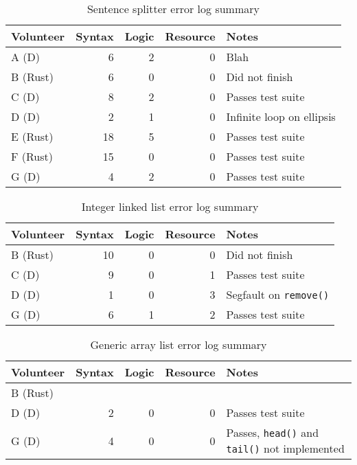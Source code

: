\documentclass[finalcopy]{srpaper}
\begin{document}
\begin{table}[h]
\centering
\begin{tabular}{lrrrp{5cm}}
\toprule
Volunteer & Syntax & Logic & Resource & Notes \\
\midrule
A (D) & 6 & 2 & 0 & Blah \\
B (Rust) & 6 & 0 & 0 & Did not finish \\
C (D) & 8 & 2 & 0 & Passes test suite \\
D (D) & 2 & 1 & 0 & Infinite loop on ellipsis \\
E (Rust) & 18 & 5 & 0 & Passes test suite \\
F (Rust) & 15 & 0 & 0 & Passes test suite \\
G (D) & 4 & 2 & 0 & Passes test suite \\
\bottomrule
\end{tabular}
\caption{Sentence splitter error log summary}
\label{tab:sentencesplitter}
\end{table}

\begin{table}[h]
\centering
\begin{tabular}{lrrrp{5cm}}
\toprule
Volunteer & Syntax & Logic & Resource & Notes \\
\midrule
B (Rust) & 10 & 0 & 0 & Did not finish \\
C (D) & 9 & 0 & 1 & Passes test suite \\
D (D) & 1 & 0 & 3 & Segfault on \texttt{remove()} \\
G (D) & 6 & 1 & 2 & Passes test suite \\
\bottomrule
\end{tabular}
\caption{Integer linked list error log summary}
\label{tab:intlinkedlist}
\end{table}

\begin{table}[h]
\centering
\begin{tabular}{lrrrp{5cm}}
\toprule
Volunteer & Syntax & Logic & Resource & Notes \\
\midrule
B (Rust) & & & & \\
D (D) & 2 & 0 & 0 & Passes test suite \\
G (D) & 4 & 0 & 0 & Passes, \texttt{head()} and \texttt{tail()} not implemented \\
\bottomrule
\end{tabular}
\caption{Generic array list error log summary}
\label{tab:genericarraylist}
\end{table}
\end{document}
